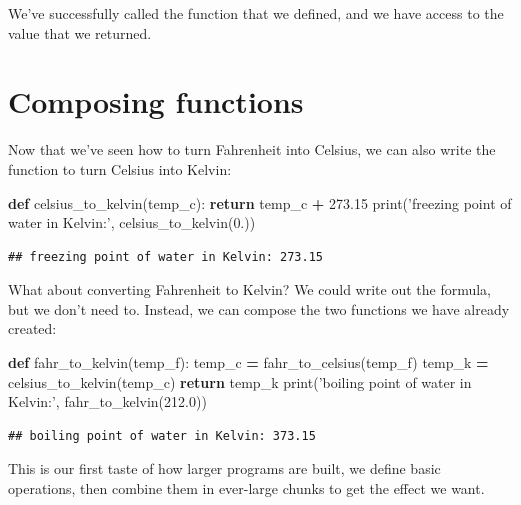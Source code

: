\documentclass[]{book}
\newenvironment{Shaded}{\begin{snugshade}}{\end{snugshade}}
\newcommand{\BuiltInTok}[1]{#1}
\newcommand{\ControlFlowTok}[1]{\textcolor[rgb]{0.13,0.29,0.53}{\textbf{#1}}}
\newcommand{\FloatTok}[1]{\textcolor[rgb]{0.00,0.00,0.81}{#1}}
\newcommand{\KeywordTok}[1]{\textcolor[rgb]{0.13,0.29,0.53}{\textbf{#1}}}
\newcommand{\NormalTok}[1]{#1}
\newcommand{\OperatorTok}[1]{\textcolor[rgb]{0.81,0.36,0.00}{\textbf{#1}}}
\newcommand{\StringTok}[1]{\textcolor[rgb]{0.31,0.60,0.02}{#1}}
\theoremstyle{definition}
\theoremstyle{definition}
\theoremstyle{definition}
\theoremstyle{remark}
\begin{document}
We've successfully called the function that we defined, and we have
access to the value that we returned.

\hypertarget{composing-functions}{%
\section{Composing functions}\label{composing-functions}}

Now that we've seen how to turn Fahrenheit into Celsius, we can also
write the function to turn Celsius into Kelvin:

\begin{Shaded}
\begin{Highlighting}[]
\KeywordTok{def}\NormalTok{ celsius_to_kelvin(temp_c):}
    \ControlFlowTok{return}\NormalTok{ temp_c }\OperatorTok{+} \FloatTok{273.15}
\BuiltInTok{print}\NormalTok{(}\StringTok{'freezing point of water in Kelvin:'}\NormalTok{, celsius_to_kelvin(}\FloatTok{0.}\NormalTok{))}
\end{Highlighting}
\end{Shaded}

\begin{verbatim}
## freezing point of water in Kelvin: 273.15
\end{verbatim}

What about converting Fahrenheit to Kelvin? We could write out the
formula, but we don't need to. Instead, we can compose the two functions
we have already created:

\begin{Shaded}
\begin{Highlighting}[]
\KeywordTok{def}\NormalTok{ fahr_to_kelvin(temp_f):}
\NormalTok{    temp_c }\OperatorTok{=}\NormalTok{ fahr_to_celsius(temp_f)}
\NormalTok{    temp_k }\OperatorTok{=}\NormalTok{ celsius_to_kelvin(temp_c)}
    \ControlFlowTok{return}\NormalTok{ temp_k}
\BuiltInTok{print}\NormalTok{(}\StringTok{'boiling point of water in Kelvin:'}\NormalTok{, fahr_to_kelvin(}\FloatTok{212.0}\NormalTok{))}
\end{Highlighting}
\end{Shaded}

\begin{verbatim}
## boiling point of water in Kelvin: 373.15
\end{verbatim}

This is our first taste of how larger programs are built, we define
basic operations, then combine them in ever-large chunks to get the
effect we want.
\end{document}
